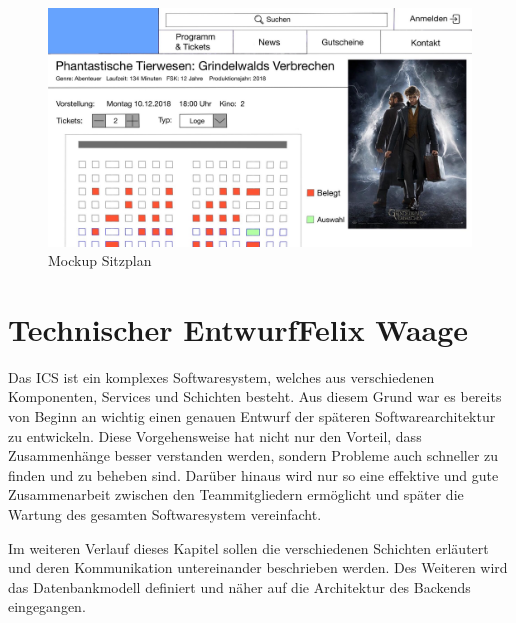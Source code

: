 		\begin{figure}[H]
			\centering 
			\includegraphics[width=14cm]{img/mockUp3.png}
			\captionsetup{format=hang}
			\caption[Mockup Sitzplan]{\label{fig:mockUpSitzplan} Mockup Sitzplan }
		\end{figure}
	
	\section[Technischer Entwurf]{Technischer Entwurf{\hfill \normalsize Felix Waage}} 	

		Das \ac{ICS} ist ein komplexes Softwaresystem, welches aus verschiedenen Komponenten, Services und Schichten besteht. Aus diesem Grund war es bereits von Beginn an wichtig einen genauen Entwurf der späteren Softwarearchitektur zu entwickeln. Diese Vorgehensweise hat nicht nur den Vorteil, dass Zusammenhänge besser verstanden werden, sondern Probleme auch schneller zu finden und zu beheben sind. Darüber hinaus wird nur so eine effektive und gute Zusammenarbeit zwischen den Teammitgliedern ermöglicht und später die Wartung des gesamten Softwaresystem vereinfacht.
		
		Im weiteren Verlauf dieses Kapitel sollen die verschiedenen Schichten erläutert und deren Kommunikation untereinander beschrieben werden. Des Weiteren wird das Datenbankmodell definiert und näher auf die Architektur des Backends eingegangen.
		

